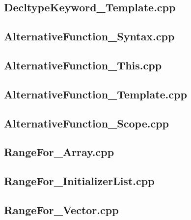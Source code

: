 \documentclass[11pt]{report}
\begin{document}
\begin{appendix}
\subsection{DecltypeKeyword\_Template.cpp}
\label{DecltypeKeyword_Template}


\subsection{AlternativeFunction\_Syntax.cpp}
\label{AlternativeFunction_Syntax}


\subsection{AlternativeFunction\_This.cpp}
\label{AlternativeFunction_This}


\subsection{AlternativeFunction\_Template.cpp}
\label{AlternativeFunction_Template}


\subsection{AlternativeFunction\_Scope.cpp}
\label{AlternativeFunction_Scope}


\subsection{RangeFor\_Array.cpp}
\label{RangeFor_Array}


\subsection{RangeFor\_InitializerList.cpp}
\label{RangeFor_InitializerList}


\subsection{RangeFor\_Vector.cpp}
\label{RangeFor_Vector}



\end{appendix}
\end{document}
